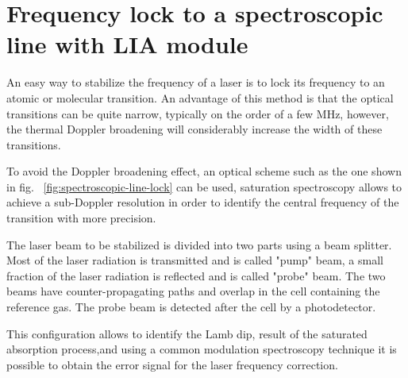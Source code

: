\section{Frequency lock to a spectroscopic line with LIA module }

An easy way to stabilize the frequency of a laser is to lock its frequency to an atomic or molecular transition.
An advantage of this method is that the optical transitions can be quite narrow, typically on the order of a few MHz, however, the thermal Doppler broadening will considerably increase the width of these transitions.

To avoid the Doppler broadening effect, an optical scheme such as the one shown in fig. ~\ref{fig:spectroscopic-line-lock} can be used, saturation spectroscopy allows to achieve a sub-Doppler resolution in order to identify the central frequency of the transition with more precision.

The laser beam to be stabilized is divided into two parts using a beam splitter. Most of the laser radiation is transmitted and is called "pump" beam, a small fraction of the laser radiation is reflected and is called "probe" beam. 
The two beams have counter-propagating paths and overlap in the cell containing the reference gas.
The probe beam is detected after the cell by a photodetector.

This configuration allows to identify the Lamb dip, result of the saturated absorption process,and using a common modulation spectroscopy technique it is possible to obtain the error signal for the laser frequency correction.

